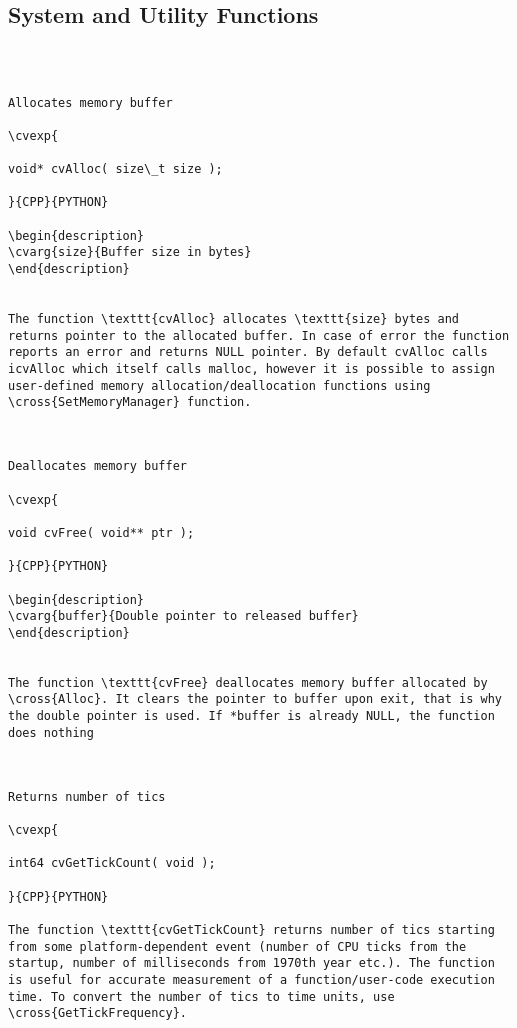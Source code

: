 \subsection{System and Utility Functions}
\begin{verbatim}


\end{verbatim}
\label{Alloc}
\begin{verbatim}

Allocates memory buffer

\cvexp{

void* cvAlloc( size\_t size );

}{CPP}{PYTHON}

\begin{description}
\cvarg{size}{Buffer size in bytes}
\end{description}


The function \texttt{cvAlloc} allocates \texttt{size} bytes and returns pointer to the allocated buffer. In case of error the function reports an error and returns NULL pointer. By default cvAlloc calls icvAlloc which itself calls malloc, however it is possible to assign user-defined memory allocation/deallocation functions using \cross{SetMemoryManager} function.


\end{verbatim}
\label{Free}
\begin{verbatim}

Deallocates memory buffer

\cvexp{

void cvFree( void** ptr );

}{CPP}{PYTHON}

\begin{description}
\cvarg{buffer}{Double pointer to released buffer}
\end{description}


The function \texttt{cvFree} deallocates memory buffer allocated by \cross{Alloc}. It clears the pointer to buffer upon exit, that is why the double pointer is used. If *buffer is already NULL, the function does nothing


\end{verbatim}
\label{GetTickCount}
\begin{verbatim}

Returns number of tics

\cvexp{

int64 cvGetTickCount( void );

}{CPP}{PYTHON}

The function \texttt{cvGetTickCount} returns number of tics starting from some platform-dependent event (number of CPU ticks from the startup, number of milliseconds from 1970th year etc.). The function is useful for accurate measurement of a function/user-code execution time. To convert the number of tics to time units, use \cross{GetTickFrequency}.


\end{verbatim}
